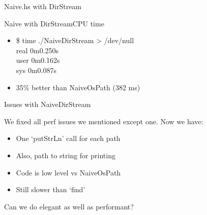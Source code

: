 \documentclass[17pt]{beamer}
\begin{document}
\begin{frame}[fragile]{Naive.hs with DirStream}
{}
\begin{minipage}{\textwidth}
\tiny
{}
\end{minipage}
\end{frame}

\begin{frame}{Naive with DirStream}{CPU time}

\begin{itemize}
\item \$ time ./NaiveDirStream > /dev/null \\
real    0m0.250s \\
user    0m0.162s \\
sys     0m0.087s \\

\item 35\% better than NaiveOsPath (382 ms)
\end{itemize}
\end{frame}

\begin{frame}{Issues with NaiveDirStream}{}

We fixed all perf issues we mentioned except one. Now we have:
\begin{itemize}
  \item One `putStrLn' call for each path
  \item Also, path to string for printing
  \item Code is low level vs NaiveOsPath
  \item Still slower than `find'
\end{itemize}

Can we do elegant as well as performant?
\end{frame}
\end{document}

